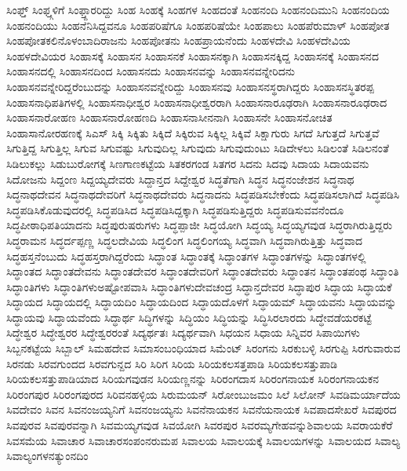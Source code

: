 {ಸಿಂಫ್ತ್
ಸಿಂಫ್ತ್ಗಳಿಗೆ
ಸಿಂಫ್ತ್ದಾರರಿದ್ದು
ಸಿಂಹ
ಸಿಂಹಕ್ಕೆ
ಸಿಂಹಗಳ
ಸಿಂಹದಂತೆ
ಸಿಂಹನಂದಿ
ಸಿಂಹನಂದಿಮುನಿ
ಸಿಂಹನಂದಿಯ
ಸಿಂಹನಂದಿಯು
ಸಿಂಹನೆನಿಸಿದ್ದವನೂ
ಸಿಂಹಪರಿಷೆಗೂ
ಸಿಂಹಪರಿಷೆಯೇ
ಸಿಂಹಪಾಲು
ಸಿಂಹಪೆರುಮಾಳ್
ಸಿಂಹಪೋತ
ಸಿಂಹಪೋತಕಲಿನೊಳಂಬಾದಿರಾಜನು
ಸಿಂಹಪೋತನು
ಸಿಂಹಪ್ರಾಯನೆಂದು
ಸಿಂಹಳದೇವಿ
ಸಿಂಹಳದೇವಿಯ
ಸಿಂಹಳದೇವಿಯರ
ಸಿಂಹಾಸಕ್ಕೆ
ಸಿಂಹಾಸನ
ಸಿಂಹಾಸನಕೆ
ಸಿಂಹಾಸನಕ್ಕಾಗಿ
ಸಿಂಹಾಸನಕ್ಕಿದ್ದ
ಸಿಂಹಾಸನಕ್ಕೆ
ಸಿಂಹಾಸನದ
ಸಿಂಹಾಸನದಲ್ಲಿ
ಸಿಂಹಾಸನದಿಂದ
ಸಿಂಹಾಸನದು
ಸಿಂಹಾಸನವನ್ನು
ಸಿಂಹಾಸನವನ್ನೇರಿದನು
ಸಿಂಹಾಸನವನ್ನೇರಿದ್ದರೆಂಬುದನ್ನು
ಸಿಂಹಾಸನವನ್ನೇರಿದ್ದು
ಸಿಂಹಾಸನವು
ಸಿಂಹಾಸನಸ್ಥರಾಗಿದ್ದರು
ಸಿಂಹಾಸನಸ್ಥಿತರಪ್ಪ
ಸಿಂಹಾಸನಾಧಿಪತಿಗಳಲ್ಲಿ
ಸಿಂಹಾಸನಾಧೀಶ್ವರ
ಸಿಂಹಾಸನಾಧೀಶ್ವರರಾಗಿ
ಸಿಂಹಾಸನಾರೂಢರಾಗಿ
ಸಿಂಹಾಸನಾರೂಢರಾದ
ಸಿಂಹಾಸನಾರೋಹಣ
ಸಿಂಹಾಸನಾರೋಹಣದಿ
ಸಿಂಹಾಸನಾಸೀನನಾಗಿ
ಸಿಂಹಾಸನೇ
ಸಿಂಹಾಸನೋಚಿತ
ಸಿಂಹಾಸಾನೋರಹಣಕ್ಕೆ
ಸಿಎಸ್
ಸಿಕ್ಕಿ
ಸಿಕ್ಕಿತು
ಸಿಕ್ಕಿದೆ
ಸಿಕ್ಕಿರುವ
ಸಿಕ್ಕಿಲ್ಲ
ಸಿಕ್ಕಿವೆ
ಸಿಕ್ಷಾಗುರು
ಸಿಗದೆ
ಸಿಗುತ್ತದೆ
ಸಿಗುತ್ತವೆ
ಸಿಗುತ್ತಿದ್ದ
ಸಿಗುತ್ತಿಲ್ಲ
ಸಿಗುವ
ಸಿಗುವಷ್ಟು
ಸಿಗುವುದಿಲ್ಲ
ಸಿಗುವುದು
ಸಿಗುವುದುಂಟು
ಸಿಡಿದೇಳಲು
ಸಿಡಿಲಂತೆ
ಸಿಡಿಲನಂತೆ
ಸಿಡಿಲುಕಲ್ಲು
ಸಿಡುಬುರೋಗಕ್ಕೆ
ಸಿಣಗಾಣಕಟ್ಟೆಯ
ಸಿತಕರಗಂಡ
ಸಿತಗರ
ಸಿದನು
ಸಿದವು
ಸಿದಾಯ
ಸಿದಾಯವನು
ಸಿದೋಜನು
ಸಿದ್ದಂಣ
ಸಿದ್ದಯ್ಯದೇವರು
ಸಿದ್ದಾನ್ತದ
ಸಿದ್ದೇಶ್ವರ
ಸಿದ್ಧತೆಗಾಗಿ
ಸಿದ್ಧನ
ಸಿದ್ಧನಂಜೇಶನ
ಸಿದ್ಧನಾಥ
ಸಿದ್ಧನಾಥದೇವನ
ಸಿದ್ಧನಾಥದೇವರಿಗೆ
ಸಿದ್ಧನಾಥದೇವರು
ಸಿದ್ಧನಾದನು
ಸಿದ್ಧಪಡಿಸಬೇಕೆಂದು
ಸಿದ್ಧಪಡಿಸಲಾಗಿದೆ
ಸಿದ್ಧಪಡಿಸಿ
ಸಿದ್ಧಪಡಿಸಿಕೊಡುವುದರಲ್ಲಿ
ಸಿದ್ಧಪಡಿಸಿದ
ಸಿದ್ಧಪಡಿಸಿದ್ದಕ್ಕಾಗಿ
ಸಿದ್ಧಪಡಿಸುತ್ತಿದ್ದರು
ಸಿದ್ಧಪಡಿಸುವವನೆಂದೂ
ಸಿದ್ಧಪೀಠಾಧಿಪತಿಯಾದನು
ಸಿದ್ಧಪುರುಷರುಗಳು
ಸಿದ್ಧಪ್ಪಾಜೀ
ಸಿದ್ಧಯೋಗಿ
ಸಿದ್ಧಯ್ಯ
ಸಿದ್ಧಯ್ಯಗವುಡ
ಸಿದ್ಧರಾಗಿರುತ್ತಿದ್ದರು
ಸಿದ್ಧರಾಮನ
ಸಿದ್ಧರ್ದಪ್ಪಣ್ಣ
ಸಿದ್ಧಲದೇವಿಯ
ಸಿದ್ಧಲಿಂಗ
ಸಿದ್ಧಲಿಂಗಯ್ಯ
ಸಿದ್ಧವಾಗಿ
ಸಿದ್ಧವಾಗಿರುತ್ತಿತ್ತು
ಸಿದ್ಧವಾದ
ಸಿದ್ಧಹಸ್ತನೆಂಬುದು
ಸಿದ್ಧಹಸ್ತರಾಗಿದ್ದರೆಂದು
ಸಿದ್ಧಾಂತ
ಸಿದ್ಧಾಂತಕ್ಕೆ
ಸಿದ್ಧಾಂತಗಳ
ಸಿದ್ಧಾಂತಗಳನ್ನು
ಸಿದ್ಧಾಂತಗಳಲ್ಲಿ
ಸಿದ್ಧಾಂತದ
ಸಿದ್ಧಾಂತದೇವನು
ಸಿದ್ಧಾಂತದೇವರ
ಸಿದ್ಧಾಂತದೇವರಿಗೆ
ಸಿದ್ಧಾಂತದೇವರು
ಸಿದ್ಧಾಂತನ
ಸಿದ್ಧಾಂತಪಂಥ
ಸಿದ್ಧಾಂತಿ
ಸಿದ್ಧಾಂತಿಗಳು
ಸಿದ್ಧಾಂತಿಗಳುಅಷ್ಟೋಪವಾಸಿ
ಸಿದ್ಧಾಂತಿಗಳುದೇವಚಂದ್ರ
ಸಿದ್ಧಾನ್ತದೇವರ
ಸಿದ್ಧಾಪುರ
ಸಿದ್ಧಾಯ
ಸಿದ್ಧಾಯಕೆ
ಸಿದ್ಧಾಯದ
ಸಿದ್ಧಾಯದಲ್ಲಿ
ಸಿದ್ಧಾಯದಿಂ
ಸಿದ್ಧಾಯದಿಂದ
ಸಿದ್ಧಾಯದೊಳಗೆ
ಸಿದ್ಧಾಯಮ್
ಸಿದ್ಧಾಯವನು
ಸಿದ್ಧಾಯವನ್ನು
ಸಿದ್ಧಾಯವು
ಸಿದ್ಧಾಯವೆಂದು
ಸಿದ್ಧಾರ್ಥ
ಸಿದ್ಧಿಗಳನ್ನು
ಸಿದ್ಧಿಯಂ
ಸಿದ್ಧಿಯನ್ನು
ಸಿದ್ಧಿಸಿರಲಾರದು
ಸಿದ್ಧೇವಡೆಯರಕಟ್ಟೆ
ಸಿದ್ಧೇಶ್ವರ
ಸಿದ್ಧೇಶ್ವರರ
ಸಿದ್ಧೇಶ್ವರರಂತೆ
ಸಿದ್ಯರ್ಥತಃ
ಸಿದ್ಯರ್ಥವಾಗಿ
ಸಿಧಯನ
ಸಿಧಾಯ
ಸಿನ್ನಿವರ
ಸಿಪಾಯಿಗಳು
ಸಿಬ್ಬನಕಟ್ಟೆಯ
ಸಿಬ್ಬಾಲ್
ಸಿಮಹದೇವ
ಸಿಮಾಸಂಬಂಧಿಯಾದ
ಸಿಮೆಂಟ್
ಸಿರಂಗನು
ಸಿರಕುಬಳ್ಳಿ
ಸಿರಗುಪ್ಪಿ
ಸಿರಗುವಾರುವ
ಸಿರನಡು
ಸಿರವಗುಂದದ
ಸಿರವಗುನ್ದದ
ಸಿರಿ
ಸಿರಿಗ
ಸಿರಿಯ
ಸಿರಿಯಕಲಸತ್ತಪಾಡಿ
ಸಿರಿಯಕಲಸತ್ತುಪಾಡಿ
ಸಿರಿಯಕಲಸತ್ತುಪಾಡಿಯಾದ
ಸಿರಿಯಗವುಡನ
ಸಿರಿಯಣ್ಣನನ್ನು
ಸಿರಿರಂಗದಾಸ
ಸಿರಿರಂಗನಾಯಕ
ಸಿರಿರಂಗನಾಯಕನ
ಸಿರಿರಂಗಪುರ
ಸಿರಿರಂಗಪುರದ
ಸಿರಿವನಹಳ್ಳಿಯ
ಸಿರುಮಯನ್
ಸಿರೋಂಬುಜಮಂ
ಸಿಲೆ
ಸಿಲೋನ್
ಸಿವಡಿಮರ್ಯಾದೆಯ
ಸಿವದೇವಂ
ಸಿವನ
ಸಿವನಂಜಯ್ಯನಿಗೆ
ಸಿವನಂಜಯ್ಯನು
ಸಿವನೆನಾಯಕನ
ಸಿವನೆಯನಾಯಕ
ಸಿವಪಾದಸೇಖರೆ
ಸಿವಪುರದ
ಸಿವಪುರವ
ಸಿವಪುರವನ್ನಾಗಿ
ಸಿವಮಯ್ಯಗವುಡ
ಸಿವಯೋಗಿ
ಸಿವರಪುರ
ಸಿವರಮ್ಯಗೇಹವನ್ನುಶಿವಾಲಯ
ಸಿವರಾಯಕೆರೆ
ಸಿವಸಮೆಯ
ಸಿವಾಚಾರ
ಸಿವಾಚಾರಸಂಪಂನರುಮಪ
ಸಿವಾಲಯ
ಸಿವಾಲಯಕ್ಕೆ
ಸಿವಾಲಯಗಳನ್ನು
ಸಿವಾಲಯದ
ಸಿವಾಲ್ಯ
ಸಿವಾಲ್ಯಂಗಳನತ್ಯುಂನದಿಂ
}
